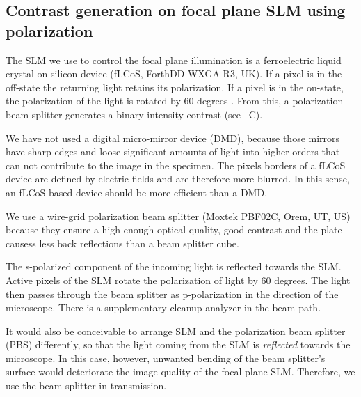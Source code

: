 \subsection{ Contrast generation on focal plane SLM using
  polarization}
The SLM we use to control the focal plane illumination is a   ferroelectric liquid crystal on silicon device
(fLCoS, ForthDD WXGA R3, UK). If a pixel is in the off-state the returning light
retains its polarization. If a pixel is in the on-state, the polarization of the
light is rotated by 60 degrees \citep{Martinez-Garcia2009}.  From
this, a polarization beam splitter generates a binary intensity
contrast (see ~C).

We have not used a digital micro-mirror device (DMD), because those
mirrors have sharp edges and loose significant amounts of light into
higher orders that can not contribute to the image in the
specimen. The pixels borders of a fLCoS device are defined by electric
fields and are therefore more blurred. In this sense, an fLCoS based
device should be more efficient than a DMD.

We use a wire-grid polarization beam splitter (Moxtek PBF02C,     
Orem, UT, US) because they ensure a high enough optical quality, good
contrast and the plate causess less back reflections than a beam
splitter cube.



The s-polarized component of the incoming light is reflected towards
the SLM. Active pixels of the SLM rotate the polarization of light by
60 degrees. The light then passes through the beam splitter as
p-polarization in the direction of the microscope. There is a
supplementary cleanup analyzer in the beam path.

It would also be conceivable to arrange SLM and the polarization beam splitter (PBS)
differently, so that the light coming from the SLM is \emph{reflected}
towards the microscope. In this case, however, unwanted bending of the
beam splitter's surface would deteriorate the image quality of the
focal plane SLM. Therefore, we use the beam splitter in transmission.




